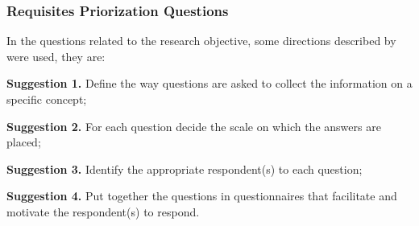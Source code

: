 \subsubsection{Requisites Priorization Questions}

In the questions related to the research objective, some directions described by  were used, they are:
\begin{description}
  \item \textbf{Suggestion 1.} Define the way questions are asked to collect the information on a specific concept;\label{suggestion:1}
  \item \textbf{Suggestion 2.} For each question decide the scale on which the answers are placed;\label{suggestion:2}
  \item \textbf{Suggestion 3.} Identify the appropriate respondent(s) to each question;\label{suggestion:3}
  \item \textbf{Suggestion 4.} Put together the questions in questionnaires that facilitate and motivate the respondent(s) to respond.\label{suggestion:4}
\end{description}


